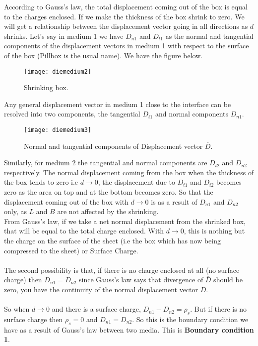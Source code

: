 	According to Gauss's law, the total displacement coming out of the box is equal to the charges enclosed. If we make the thickness of the box shrink to zero. We will get a relationship between the displacement vector going in all directions as $d$ shrinks.  Let's say in medium 1 we have $D_{n1}$ and $D_{t1}$ as the normal and tangential components of the displacement vectors in medium 1 with respect to the surface of the box (Pillbox is the usual name). We have the figure below.
	
	\begin{figure}[h]
		\centering
		\texttt{[image: diemedium2]}
		\caption{Shrinking box.}
	\end{figure}

	Any general displacement vector in medium 1 close to the interface can be resolved into two components, the tangential $D_{t1}$ and normal components $D_{n1}$. 
		\begin{figure}[h]
		\centering
		\texttt{[image: diemedium3]}
		\caption{Normal and tangential components of Displacement vector $\overline{D}$.}
	\end{figure}
	Similarly, for medium 2 the tangential and normal components are $D_{t2}$ and $D_{n2}$ respectively. The normal displacement coming from the box when the thickness of the box tends to zero i.e $d \longrightarrow 0$, the displacement due to $D_{t1}$ and $D_{t2}$ becomes zero as the area on top and at the bottom becomes zero. So that the displacement coming out of the box with $d \longrightarrow 0$ is as a result of $D_{n1}$ and $D_{n2}$ only, as $L$ and $B$ are not affected by the shrinking.\\
	 From Gauss's law, if we take a net normal displacement from the shrinked box, that will be equal to the total charge enclosed. With $d \longrightarrow 0$, this is nothing but the charge on the surface of the sheet (i.e the box which has now being compressed to the sheet) or Surface Charge.\\ \\ 
	The second possibility is that, if there is no charge enclosed at all (no surface charge) then $D_{n1}= D_{n2}$ since Gauss's law says that divergence of $\overline{D}$ should be zero, you have the continuity of the normal displacement vector $\overline{D}$.\\ \\ 
	So when 
	$d \longrightarrow 0$ and there is a surface charge, $D_{n1}- D_{n2} = \rho_s$. But if there is no surface charge then $\rho_s = 0$ and $D_{n1}= D_{n2}$. So this is the boundary condition we have as a result of Gauss's law between two media. This is \textbf{Boundary condition 1}.
	
